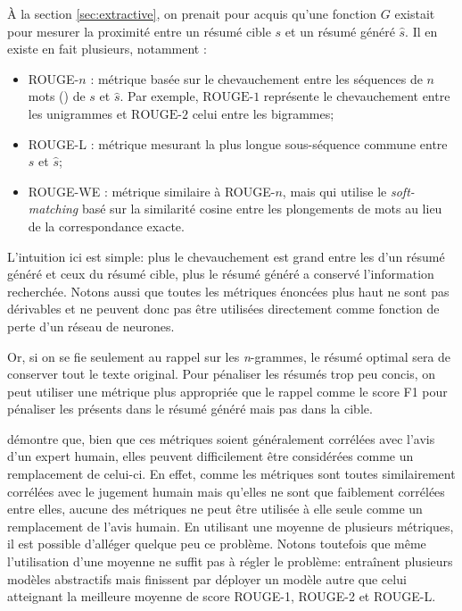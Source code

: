 À la section \ref{sec:extractive}, on prenait pour acquis qu'une fonction $G$ existait
pour mesurer la proximité entre un résumé cible $s$ et un résumé généré $\hat{s}$.
Il en existe en fait plusieurs, notamment :

\begin{itemize}
    \item ROUGE-$n$ \citep{lin-2004-rouge}: métrique basée sur le chevauchement entre les séquences de $n$ mots (\ngrams)
          de $s$ et $\hat{s}$. Par exemple, $\text{ROUGE-1}$ représente le chevauchement entre les unigrammes
          et $\text{ROUGE-2}$ celui entre les bigrammes;
    \item ROUGE-L \citep{lin-2004-rouge}: métrique mesurant la plus longue sous-séquence commune
          entre $s$ et $\hat{s}$;
    \item ROUGE-WE \citep{ng-abrecht-2015-better}: métrique similaire à ROUGE-$n$, mais qui utilise
          le \textit{soft-matching} basé sur la similarité cosine entre les plongements de mots au lieu
          de la correspondance exacte.
\end{itemize}
L'intuition ici est simple: plus le chevauchement est grand entre les 
\ngrams d'un résumé généré et ceux du résumé cible, plus le résumé
généré a conservé l'information recherchée.
Notons aussi que toutes les métriques énoncées plus haut ne sont pas dérivables
et ne peuvent donc pas être utilisées directement comme fonction de perte
d'un réseau de neurones. 

Or, si on se fie seulement au rappel sur les \textit{n}-grammes, le résumé optimal sera
de conserver tout le texte original. 
Pour pénaliser les résumés trop peu concis, on peut utiliser une métrique plus
appropriée que le rappel comme le score F1 pour pénaliser les 
\ngrams présents dans le résumé généré mais pas dans la cible.

\citet{peyrard-2019-studying} démontre que, bien que ces métriques soient généralement
corrélées avec l'avis d'un expert humain, elles peuvent difficilement être considérées
comme un remplacement de celui-ci.
En effet, comme les métriques sont toutes similairement corrélées avec le jugement humain
mais qu'elles ne sont que faiblement corrélées entre elles, aucune des métriques
ne peut être utilisée à elle seule comme un remplacement de l'avis humain.
En utilisant une moyenne de plusieurs métriques, il est possible d'alléger quelque peu
ce problème.
Notons toutefois que même l'utilisation d'une moyenne ne suffit pas à régler le problème:
\citet{DBLP:journals/corr/PaulusXS17} entraînent plusieurs modèles abstractifs 
mais finissent par déployer un modèle autre que celui atteignant la meilleure 
moyenne de score ROUGE-1, ROUGE-2 et ROUGE-L.



